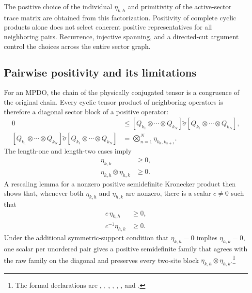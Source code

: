 \documentclass{article}
\begin{document}
The positive choice of the individual $\eta_{k,h}$ and primitivity of the
active-sector trace matrix are obtained from this factorization. Positivity of
complete cyclic products alone does not select coherent positive
representatives for all neighboring pairs. Recurrence, injective spanning, and
a directed-cut argument control the choices across the entire sector graph.

\subsection{Pairwise positivity and its limitations}

For an MPDO, the chain of the physically conjugated tensor is a congruence of
the original chain. Every cyclic tensor product of neighboring operators is
therefore a diagonal sector block of a positive operator:
\begin{align}
    0
        &\leq
        \left[Q_{k_1}\otimes\cdots\otimes Q_{k_N}\right]
        \widetilde{\sigma}
        \left[Q_{k_1}\otimes\cdots\otimes Q_{k_N}\right],
    \label{eq:cpgsv17_mpdo_sal_zcl_eta_local_structure_projected_chain_positive}\\
    \left[Q_{k_1}\otimes\cdots\otimes Q_{k_N}\right]
    \widetilde{\sigma}
    \left[Q_{k_1}\otimes\cdots\otimes Q_{k_N}\right]
        &=
        \bigotimes_{n=1}^{N}\eta_{k_n,k_{n+1}}.
    \label{eq:cpgsv17_mpdo_sal_zcl_eta_local_structure_projected_chain_tensor_product}
\end{align}
The length-one and length-two cases imply
\begin{align}
    \eta_{k,k}
        &\geq 0,
    \label{eq:cpgsv17_mpdo_sal_zcl_eta_local_structure_diagonal_eta_positive}\\
    \eta_{k,h}\otimes\eta_{h,k}
        &\geq 0.
    \label{eq:cpgsv17_mpdo_sal_zcl_eta_local_structure_two_cycle_positive}
\end{align}
A rescaling lemma for a nonzero positive semidefinite Kronecker product then
shows that, whenever both $\eta_{k,h}$ and $\eta_{h,k}$ are nonzero, there is
a scalar $c\neq 0$ such that
\begin{align}
    c\,\eta_{k,h}
        &\geq 0,
    \label{eq:cpgsv17_mpdo_sal_zcl_eta_local_structure_forward_pair_rescaling}\\
    c^{-1}\eta_{h,k}
        &\geq 0.
    \label{eq:cpgsv17_mpdo_sal_zcl_eta_local_structure_reverse_pair_rescaling}
\end{align}
Under the additional symmetric-support condition that $\eta_{k,h}=0$ implies
$\eta_{h,k}=0$, one scalar per unordered pair gives a positive semidefinite
family that agrees with the raw family on the diagonal and preserves every
two-site block $\eta_{k,h}\otimes\eta_{h,k}$.\footnote{The formal declarations
are
,
,
,
,
,
, and
.}
\end{document}
